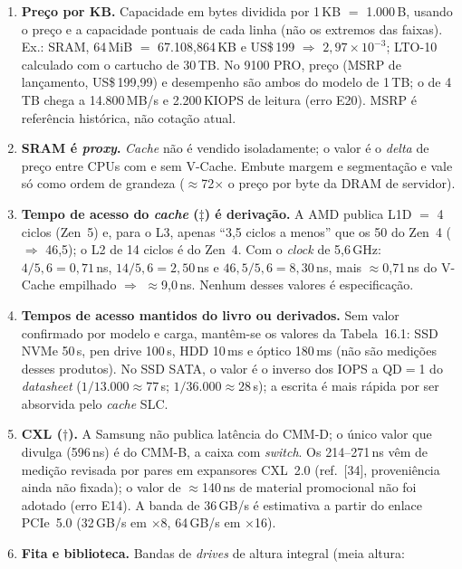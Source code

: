 \documentclass[11pt,a4paper]{article}
\newcommand{\us}{\,\textmu s}
\begin{document}
{\small
\begin{enumerate}[label=\textbf{N\arabic*.},leftmargin=*]
\item \textbf{Preço por KB.} Capacidade em bytes dividida por 1\,KB $=$ 1.000\,B, usando o
      preço e a capacidade pontuais de cada linha (não os extremos das faixas). Ex.: SRAM,
      64\,MiB $=$ 67.108,864\,KB e US\$\,199 $\Rightarrow$ $2{,}97\times10^{-3}$; LTO-10
      calculado com o cartucho de 30\,TB. No 9100 PRO, preço (MSRP de lançamento, US\$\,199,99)
      e desempenho são ambos do modelo de 1\,TB; o de 4\,TB chega a 14.800\,MB/s e
      2.200\,KIOPS de leitura (erro E20). MSRP é referência histórica, não cotação atual.
\item \textbf{SRAM é \emph{proxy}.} \emph{Cache} não é vendido isoladamente; o valor é o
      \emph{delta} de preço entre CPUs com e sem V-Cache. Embute margem e segmentação e vale
      só como ordem de grandeza ($\approx$72$\times$ o preço por byte da DRAM de servidor).
\item \textbf{Tempo de acesso do \emph{cache} ($\ddagger$) é derivação.} A AMD publica
      L1D $=$ 4 ciclos (Zen~5) e, para o L3, apenas ``3,5 ciclos a menos'' que os 50 do Zen~4
      ($\Rightarrow$ 46,5); o L2 de 14 ciclos é do Zen~4. Com o \emph{clock} de 5,6\,GHz:
      $4/5{,}6=0{,}71$\,ns, $14/5{,}6=2{,}50$\,ns e $46{,}5/5{,}6=8{,}30$\,ns, mais $\approx$0,71\,ns
      do V-Cache empilhado $\Rightarrow$ $\approx$9,0\,ns. Nenhum desses valores é especificação.
\item \textbf{Tempos de acesso mantidos do livro ou derivados.} Sem valor confirmado por
      modelo e carga, mantêm-se os valores da Tabela~16.1: SSD NVMe 50\us, pen drive 100\us,
      HDD 10\,ms e óptico 180\,ms (não são medições desses produtos). No SSD SATA, o valor
      é o inverso dos IOPS a QD$=$1 do \emph{datasheet} ($1/13.000\approx77$\us;
      $1/36.000\approx28$\us); a escrita é mais rápida por ser absorvida pelo \emph{cache} SLC.
\item \textbf{CXL ($\dagger$).} A Samsung não publica latência do CMM-D; o único valor que
      divulga (596\,ns) é do CMM-B, a caixa com \emph{switch}. Os 214--271\,ns vêm de medição
      revisada por pares em expansores CXL~2.0 (ref.~[34], proveniência ainda não fixada); o
      valor de $\approx$140\,ns de material promocional não foi adotado (erro E14). A banda de
      36\,GB/s é estimativa a partir do enlace PCIe~5.0 (32\,GB/s em $\times$8, 64\,GB/s em
      $\times$16).
\item \textbf{Fita e biblioteca.} Bandas de \emph{drives} de altura integral (meia altura:

\end{enumerate}}
\end{document}
